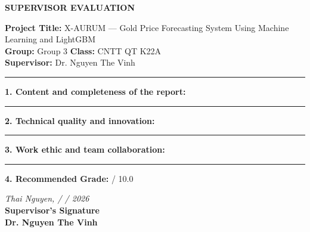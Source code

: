 \newpage
\thispagestyle{empty}

\begin{center}
{\large\bfseries SUPERVISOR EVALUATION}\\[1cm]
\end{center}

\noindent\textbf{Project Title:} X-AURUM --- Gold Price Forecasting System Using Machine Learning and LightGBM\\[0.4cm]
\noindent\textbf{Group:} Group 3 \hspace{2cm} \textbf{Class:} CNTT QT K22A\\[0.4cm]
\noindent\textbf{Supervisor:} Dr. Nguyen The Vinh\\[1cm]

\noindent\rule{\linewidth}{0.4pt}

\noindent\textbf{1. Content and completeness of the report:}

\vspace{3cm}

\noindent\rule{\linewidth}{0.4pt}

\noindent\textbf{2. Technical quality and innovation:}

\vspace{3cm}

\noindent\rule{\linewidth}{0.4pt}

\noindent\textbf{3. Work ethic and team collaboration:}

\vspace{3cm}

\noindent\rule{\linewidth}{0.4pt}

\noindent\textbf{4. Recommended Grade:} \underline{\hspace{4cm}} / 10.0

\vspace{1.5cm}

\begin{flushright}
\textit{Thai Nguyen, \hspace{3cm} / \hspace{1cm} / 2026}\\[2cm]
\textbf{Supervisor's Signature}\\[0.5cm]
\textbf{Dr. Nguyen The Vinh}
\end{flushright}
